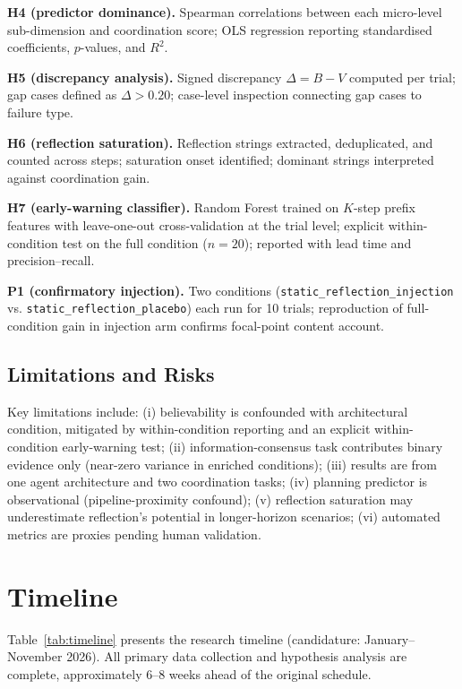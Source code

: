 \documentclass[11pt]{article}
\begin{document}
\textbf{H4 (predictor dominance).} Spearman correlations between each micro-level sub-dimension and coordination score; OLS regression reporting standardised coefficients, $p$-values, and $R^2$.

\textbf{H5 (discrepancy analysis).} Signed discrepancy $\Delta = B - V$ computed per trial; gap cases defined as $\Delta > 0.20$; case-level inspection connecting gap cases to failure type.

\textbf{H6 (reflection saturation).} Reflection strings extracted, deduplicated, and counted across steps; saturation onset identified; dominant strings interpreted against coordination gain.

\textbf{H7 (early-warning classifier).} Random Forest trained on $K$-step prefix features with leave-one-out cross-validation at the trial level; explicit within-condition test on the full condition ($n = 20$); reported with lead time and precision--recall.

\textbf{P1 (confirmatory injection).} Two conditions (\texttt{static\_reflection\_injection} vs. \texttt{static\_reflection\_placebo}) each run for 10 trials; reproduction of full-condition gain in injection arm confirms focal-point content account.

\subsection{Limitations and Risks}

Key limitations include: (i) believability is confounded with architectural condition, mitigated by within-condition reporting and an explicit within-condition early-warning test; (ii) information-consensus task contributes binary evidence only (near-zero variance in enriched conditions); (iii) results are from one agent architecture and two coordination tasks; (iv) planning predictor is observational (pipeline-proximity confound); (v) reflection saturation may underestimate reflection's potential in longer-horizon scenarios; (vi) automated metrics are proxies pending human validation.

\section{Timeline}

Table~\ref{tab:timeline} presents the research timeline (candidature: January--November 2026). All primary data collection and hypothesis analysis are complete, approximately 6--8 weeks ahead of the original schedule.
\end{document}
